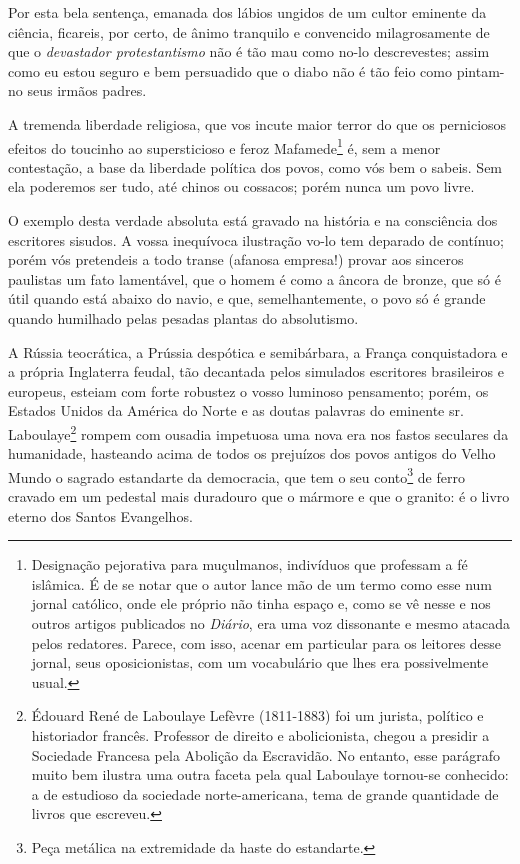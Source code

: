 Por esta bela sentença, emanada dos lábios ungidos de um cultor eminente
da ciência, ficareis, por certo, de ânimo tranquilo e convencido
milagrosamente de que o \emph{devastador protestantismo} não é tão mau
como no-lo descrevestes; assim como eu estou seguro e bem persuadido que
o diabo não é tão feio como pintam-no seus irmãos padres.

A tremenda liberdade religiosa, que vos incute maior terror do que os
perniciosos efeitos do toucinho ao supersticioso e feroz
Mafamede\footnote{Designação pejorativa para muçulmanos, indivíduos
  que professam a fé islâmica. É de se notar que o autor lance mão de um
  termo como esse num jornal católico, onde ele próprio não tinha espaço
  e, como se vê nesse e nos outros artigos publicados no \emph{Diário},
  era uma voz dissonante e mesmo atacada pelos redatores. Parece, com
  isso, acenar em particular para os leitores desse jornal, seus
  oposicionistas, com um vocabulário que lhes era possivelmente usual.}
é, sem a menor contestação, a base da liberdade política dos povos, como
vós bem o sabeis. Sem ela poderemos ser tudo, até chinos ou cossacos;
porém nunca um povo livre.

O exemplo desta verdade absoluta está gravado na história e na
consciência dos escritores sisudos. A vossa inequívoca ilustração vo-lo
tem deparado de contínuo; porém vós pretendeis a todo transe (afanosa
empresa!) provar aos sinceros paulistas um fato lamentável, que o homem
é como a âncora de bronze, que só é útil quando está abaixo do navio, e
que, semelhantemente, o povo só é grande quando humilhado pelas pesadas
plantas do absolutismo.

A Rússia teocrática, a Prússia despótica e semibárbara, a França
conquistadora e a própria Inglaterra feudal, tão decantada pelos
simulados escritores brasileiros e europeus, esteiam com forte robustez
o vosso luminoso pensamento; porém, os Estados Unidos da América do
Norte e as doutas palavras do eminente sr.\,Laboulaye\footnote{Édouard
  René de Laboulaye Lefèvre (1811-1883) foi um jurista, político e
  historiador francês. Professor de direito e abolicionista, chegou a
  presidir a Sociedade Francesa pela Abolição da Escravidão. No entanto,
  esse parágrafo muito bem ilustra uma outra faceta pela qual Laboulaye
  tornou-se conhecido: a de estudioso da sociedade norte-americana, tema
  de grande quantidade de livros que escreveu.} rompem com ousadia
impetuosa uma nova era nos fastos seculares da humanidade, hasteando
acima de todos os prejuízos dos povos antigos do Velho Mundo o sagrado
estandarte da democracia, que tem o seu conto\footnote{Peça metálica
  na extremidade da haste do estandarte.} de ferro cravado em um
pedestal mais duradouro que o mármore e que o granito: é o livro eterno
dos Santos Evangelhos.

